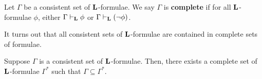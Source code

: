 \begin{boxdefinition}[Completeness]\label{Ch1:Def:Complete}
    Let $\Gamma$ be a consistent set of $\mathbf{L}$-formulae. We say $\Gamma$ is \textbf{complete} if for all $\mathbf{L}$-formulae $\phi$, either $\Gamma \vdash_{\mathbf{L}} \phi$ or $\Gamma \vdash_{\mathbf{L}} \left( \neg \phi \right)$.
\end{boxdefinition}

It turns out that all consistent sets of $\mathbf{L}$-formulae are contained in complete sets of formulae.

\begin{boxtheorem}\label{Ch1:Thm:Lindenbaum}
    Suppose $\Gamma$ is a consistent set of $\mathbf{L}$-formulae. Then, there exists a complete set of $\mathbf{L}$-formulae $\Gamma^*$ such that $\Gamma \subseteq \Gamma^*$.
\end{boxtheorem}
